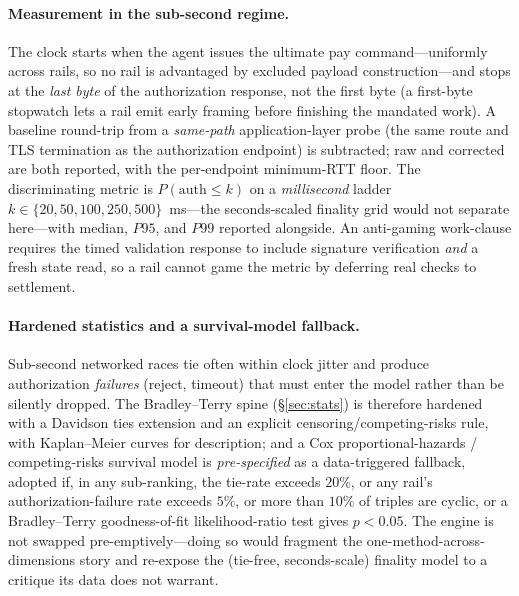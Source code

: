 \documentclass[11pt]{article}
\begin{document}
\paragraph{Measurement in the sub-second regime.} The clock starts when the agent issues the ultimate
pay command---uniformly across rails, so no rail is advantaged by excluded payload construction---and
stops at the \emph{last byte} of the authorization response, not the first byte (a first-byte stopwatch
lets a rail emit early framing before finishing the mandated work). A baseline round-trip from a
\emph{same-path} application-layer probe (the same route and TLS termination as the authorization
endpoint) is subtracted; raw and corrected are both reported, with the per-endpoint minimum-RTT floor.
The discriminating metric is $P(\text{auth} \le k)$ on a \emph{millisecond} ladder $k \in
\{20,50,100,250,500\}$~ms---the seconds-scaled finality grid would not separate here---with median,
$P95$, and $P99$ reported alongside. An anti-gaming work-clause requires the timed validation response
to include signature verification \emph{and} a fresh state read, so a rail cannot game the metric by
deferring real checks to settlement.

\paragraph{Hardened statistics and a survival-model fallback.} Sub-second networked races tie often
within clock jitter and produce authorization \emph{failures} (reject, timeout) that must enter the
model rather than be silently dropped. The Bradley--Terry spine (\S\ref{sec:stats}) is therefore
hardened with a Davidson ties extension and an explicit censoring/competing-risks rule, with
Kaplan--Meier curves for description; and a Cox proportional-hazards / competing-risks survival model is
\emph{pre-specified} as a data-triggered fallback, adopted if, in any sub-ranking, the tie-rate exceeds
$20\%$, or any rail's authorization-failure rate exceeds $5\%$, or more than $10\%$ of triples are
cyclic, or a Bradley--Terry goodness-of-fit likelihood-ratio test gives $p<0.05$. The engine is not
swapped pre-emptively---doing so would fragment the one-method-across-dimensions story and re-expose
the (tie-free, seconds-scale) finality model to a critique its data does not warrant.
\end{document}
